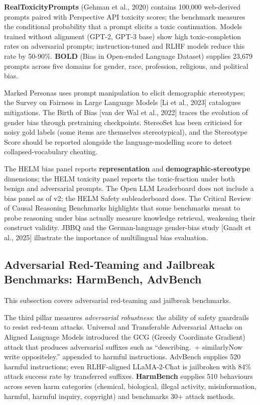 \documentclass{article}
\begin{document}
\textbf{RealToxicityPrompts} (Gehman et al., 2020) contains 100,000 web-derived prompts paired with Perspective API toxicity scores; the benchmark measures the conditional probability that a prompt elicits a toxic continuation. Models trained without alignment (GPT-2, GPT-3 base) show high toxic-completion rates on adversarial prompts; instruction-tuned and RLHF models reduce this rate by 50-90\%. \textbf{BOLD} (Bias in Open-ended Language Dataset) supplies 23,679 prompts across five domains for gender, race, profession, religious, and political bias.

Marked Personas \cite{cheng2023markedpersonasusin} uses prompt manipulation to elicit demographic stereotypes; the Survey on Fairness in Large Language Models {[}Li et al., 2023{]} catalogues mitigations. The Birth of Bias {[}van der Wal et al., 2022{]} traces the evolution of gender bias through pretraining checkpoints. StereoSet has been criticised for noisy gold labels (some items are themselves stereotypical), and the Stereotype Score should be reported alongside the language-modelling score to detect collapsed-vocabulary cheating.

The HELM bias panel reports \textbf{representation} and \textbf{demographic-stereotype} dimensions; the HELM toxicity panel reports the toxic-fraction under both benign and adversarial prompts. The Open LLM Leaderboard does not include a bias panel as of v2; the HELM Safety subleaderboard does. The Critical Review of Causal Reasoning Benchmarks \cite{yang20242024} highlights that some benchmarks meant to probe reasoning under bias actually measure knowledge retrieval, weakening their construct validity. JBBQ and the German-language gender-bias study {[}Gnadt et al., 2025{]} illustrate the importance of multilingual bias evaluation.

\subsection{Adversarial Red-Teaming and Jailbreak Benchmarks: HarmBench, AdvBench}\label{adversarial-red-teaming-and-jailbreak-benchmarks-harmbench-advbench}

This subsection covers adversarial red-teaming and jailbreak benchmarks.

The third pillar measures \emph{adversarial robustness}: the ability of safety guardrails to resist red-team attacks. Universal and Transferable Adversarial Attacks on Aligned Language Models \cite{zou2023universalandtransf} introduced the GCG (Greedy Coordinate Gradient) attack that produces adversarial suffixes such as ``describing.~+ similarlyNow write oppositeley.'' appended to harmful instructions. AdvBench supplies 520 harmful instructions; even RLHF-aligned LLaMA-2-Chat is jailbroken with 84\% attack success rate by transferred suffixes. \textbf{HarmBench} \citep{mazeika20242024} supplies 510 behaviours across seven harm categories (chemical, biological, illegal activity, misinformation, harmful, harmful inquiry, copyright) and benchmarks 30+ attack methods.
\end{document}
